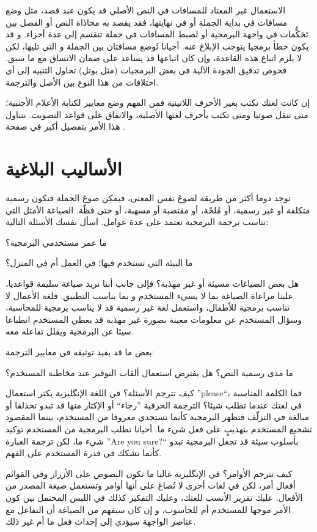 الاستعمال غير المعتاد للمسافات في النص الأصلي قد يكون عند قصد، مثل وضع
مسافات في بداية الجملة أو في نهايتها، فقد يقصد به محاذاة النص أو الفصل
بين تَحَكُّمات في واجهة البرمجية أو لضبط المسافات في جملة تنقسم إلى عدة
أجزاء. و قد يكون خطأ برمجيا يتوجب الإبلاغ عنه. أحيانا تُوضع مسافتان بين
الجملة و التي تليها، لكن لا يلزم اتباع هذه القاعدة، وإن كان اتباعها قد
يساعد على ضمان الاتساق مع ما سبق. فحوص تدقيق الجودة الآلية في بعض
البرمجيات (مثل بوتل) تحاول التنبيه إلى أي اختلافات من هذا النوع بين
الأصل والترجمة.

إن كانت لغتك تكتب بغير الأحرف اللاتينية فمن المهم وضع معايير لكتابة
الأعلام الأجنبية؛ متى تنقل صوتيا ومتى تكتب بأحرف لغتها الأصلية،
والاتفاق على قواعد التصويت. نتناول هذا الأمر بتفصيل أكبر في صفحة
.

\section{الأساليب البلاغية}
توجد دوما أكثر من طريقة لصوغ نفس المعنى، فيمكن صوغ الجملة فتكون رسمية
متكلفة أو غير رسمية، أو مُلحّة، أو مقتضبة أو مسهبة، أو حتى فظّة.
الصياغة الأمثل التي تناسب ترجمة البرمجية تعتمد على عدة عوامل. اسأل نفسك
الأسئلة التالية:

\startitemize[1]
\item ما عمر مستخدمي البرمجية؟
\item ما البيئة التي تستخدم فيها؛ في العمل أم في المنزل؟
\item هل بعض الصياغات مسيئة أو غير مهذبة؟
\stopitemize
فإلى جانب أننا نريد صياغة سليمة قواعديا، علينا مراعاة الصياغة بما لا
يسيء المستخدم و بما يناسب التطبيق. فلغة الأعمال لا تناسب برمجية
للأطفال، واستعمل لغة غير رسمية قد لا يناسب برمجية للمحاسبة، وسؤال
المستخدم عن معلومات معينة بصورة غير مهذبة قد يعطي المستخدم انطباعا سيئا
عن البرمجية ويقلل تفاعله معه. 

بعض ما قد يفيد توثيقه في معايير الترجمة:

\startitemize[1]
\item ما مدى رسمية النص؟ هل يفترض استعمال ألقاب التوقير عند مخاطبة
المستخدم؟
\item كيف تترجم الأسئلة؟ في اللغة الإنگليزية يكثر استعمال ”please“، فما
الكلمة المناسبة في لغتك عندما تطلب شيئا؟ الترجمة الحرفية ”رجاء“ أو
الإكثار منها قد تبدو تحذلقا أو مبالغة في التزلّف فتظهر البرمجية كأنما
تستجدي معروفا من المستخدم، بينما المقصود تشجيع المستخدم بتهذيبٍ على فعل
شيء ما. أحيانا تطلب البرمجية من المستخدم توكيد شيء ما، لكن ترجمة
العبارة ”Are you sure?“ بأسلوب سيئة قد تجعل البرمجية تبدو كأنما تشكك في
قدرة المستخدم على الفهم.
\item كيف تترجم الأوامر؟ في الإنگليزية غالبا ما تكون النصوص على الأزرار
وفي القوائم أفعال أمر، لكن في لغات أخرى لا تُصاغ على أنها أوامر وتستعمل
صيغة المصدر من الأفعال. عليك تقرير الأنسب للغتك، وعليك التفكير كذلك في
اللبس المحتمل بين كون الأمر موجها للمستخدم أم للحاسوب، و إن كان سيفهم
من الصياغة أن التفاعل مع عناصر الواجهة سيؤدي إلى إحداث فعل ما أم غير
ذلك.
\stopitemize
